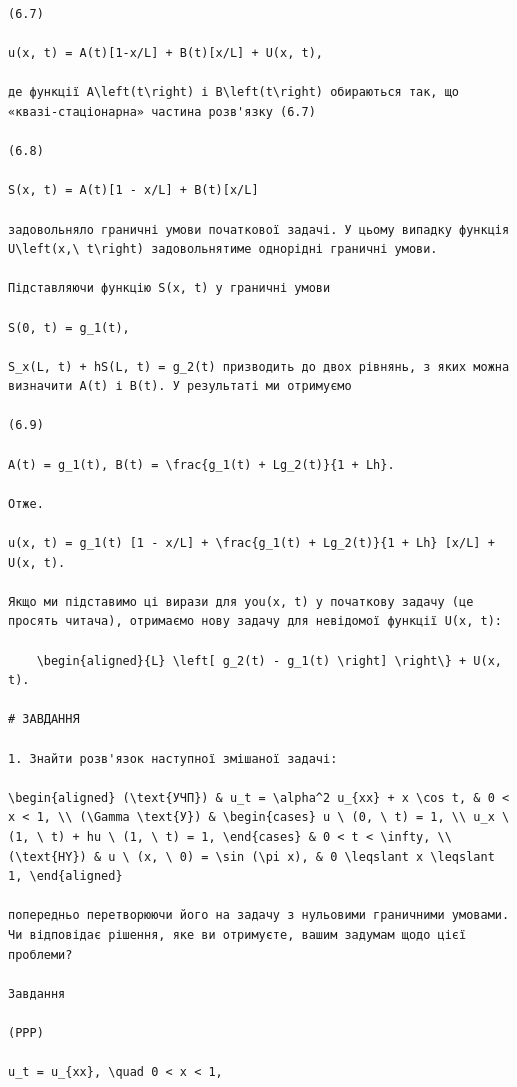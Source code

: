\documentclass[
  ukrainian,
]{article}
\begin{document}
\begin{verbatim}
(6.7)

u(x, t) = A(t)[1-x/L] + B(t)[x/L] + U(x, t),

де функції A\left(t\right) і B\left(t\right) обираються так, що «квазі-стаціонарна» частина розв'язку (6.7)

(6.8)

S(x, t) = A(t)[1 - x/L] + B(t)[x/L]

задовольняло граничні умови початкової задачі. У цьому випадку функція U\left(x,\ t\right) задовольнятиме однорідні граничні умови.

Підставляючи функцію S(x, t) у граничні умови

S(0, t) = g_1(t),

S_x(L, t) + hS(L, t) = g_2(t) призводить до двох рівнянь, з яких можна визначити A(t) і B(t). У результаті ми отримуємо

(6.9)

A(t) = g_1(t), B(t) = \frac{g_1(t) + Lg_2(t)}{1 + Lh}.

Отже.

u(x, t) = g_1(t) [1 - x/L] + \frac{g_1(t) + Lg_2(t)}{1 + Lh} [x/L] + U(x, t).

Якщо ми підставимо ці вирази для you(x, t) у початкову задачу (це просять читача), отримаємо нову задачу для невідомої функції U(x, t):

    \begin{aligned}{L} \left[ g_2(t) - g_1(t) \right] \right\} + U(x, t).

# ЗАВДАННЯ

1. Знайти розв'язок наступної змішаної задачі:

\begin{aligned} (\text{УЧП}) & u_t = \alpha^2 u_{xx} + x \cos t, & 0 < x < 1, \\ (\Gamma \text{У}) & \begin{cases} u \ (0, \ t) = 1, \\ u_x \ (1, \ t) + hu \ (1, \ t) = 1, \end{cases} & 0 < t < \infty, \\ (\text{HY}) & u \ (x, \ 0) = \sin (\pi x), & 0 \leqslant x \leqslant 1, \end{aligned}

попередньо перетворюючи його на задачу з нульовими граничними умовами. Чи відповідає рішення, яке ви отримуєте, вашим задумам щодо цієї проблеми?

Завдання

(PPP)

u_t = u_{xx}, \quad 0 < x < 1,


\end{verbatim}
\end{document}
